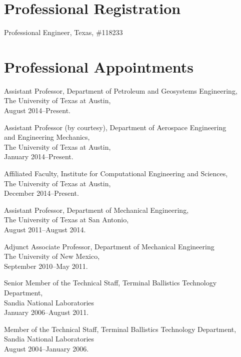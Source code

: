 \documentclass[12pt,letterpaper]{article}
\renewenvironment{itemize}{
  \begin{list}{}{
    \setlength{\leftmargin}{1.5em}
    \setlength{\itemsep}{0.25em}
    \setlength{\parskip}{0pt}
    \setlength{\parsep}{0.25em}
  }
}{
  \end{list}
}
\begin{document}
\section*{Professional Registration}

\begin{itemize}
    \item Professional Engineer, Texas, \#118233
\end{itemize}


\ifdefined\ispdf
\section*{Professional Appointments}

\begin{itemize}
    \item Assistant Professor, Department of Petroleum and Geosystems Engineering, \\ 
          The University of Texas at Austin, \\
          August 2014--Present. 

    \item Assistant Professor (by courtesy), Department of Aerospace Engineering \\ 
          and Engineering Mechanics, \\ 
          The University of Texas at Austin, \\
          January 2014--Present. 

    \item Affiliated Faculty, Institute for Computational Engineering and Sciences, \\ 
          The University of Texas at Austin, \\
          December 2014--Present. 

    \item Assistant Professor, Department of Mechanical Engineering, \\ 
          The University of Texas at San Antonio,\\
          August 2011--August 2014. 

    \item Adjunct Associate Professor, Department of Mechanical Engineering \\
          The University of New Mexico, \\ 
          September 2010--May 2011.

    \item Senior Member of the Technical Staff, Terminal Ballistics Technology Department, \\ 
          Sandia National Laboratories \\
          January 2006--August 2011.

    \item Member of the Technical Staff, Terminal Ballistics Technology Department, \\ 
          Sandia National Laboratories\\
          August 2004--January 2006.
\end{itemize}
\else
\end{document}
